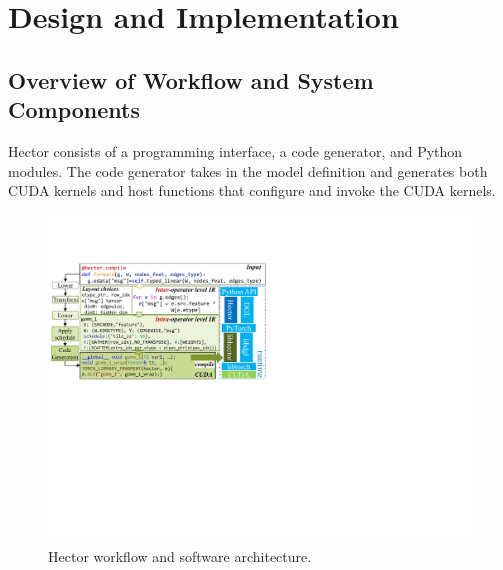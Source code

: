 \section{Design and Implementation}\label{sec:design}

\subsection{Overview of Workflow and System Components}\label{sec:hector_overview}
Hector consists of a programming interface, a code generator, and Python modules.
The code generator takes in the model definition and generates both CUDA kernels and host functions that configure and invoke the CUDA kernels.


\begin{figure}[!t]
\centering
\includegraphics[width=\linewidth]{figures/Hector/RuntimeArch_v3.6.pdf}
\caption{\label{fig:runtime_arch} Hector workflow and software architecture. }
\end{figure}


